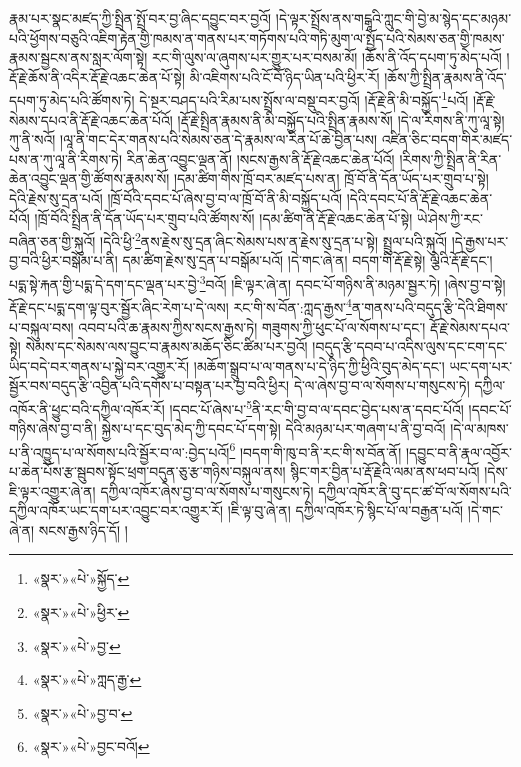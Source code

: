 རྣམ་པར་སྣང་མཛད་ཀྱི་སྤྲིན་སྤྲོ་བར་བྱ་ཞིང་དབྱུང་བར་བྱའོ། །དེ་ལྟར་སྤྲོས་ནས་གངྒཱའི་ཀླུང་གི་བྱེ་མ་སྙེད་དང་མཉམ་པའི་ཕྱོགས་བཅུའི་འཇིག་རྟེན་གྱི་ཁམས་ན་གནས་པར་གཏོགས་པའི་གཏི་མུག་ལ་སྤྱོད་པའི་སེམས་ཅན་གྱི་ཁམས་རྣམས་སྦྱངས་ནས་སླར་ལོག་སྟེ། རང་གི་ལུས་ལ་ཞུགས་པར་གྱུར་པར་བསམ་མོ། །ཆོས་ནི་འོད་དཔག་ཏུ་མེད་པའོ། །རྡོ་རྗེ་ཆོས་ནི་འདིར་རྡོ་རྗེ་འཆང་ཆེན་པོ་སྟེ། མི་འཇིགས་པའི་ངོ་བོ་ཉིད་ཡིན་པའི་ཕྱིར་རོ། །ཆོས་ཀྱི་སྤྲིན་རྣམས་ནི་འོད་དཔག་ཏུ་མེད་པའི་ཚོགས་ཏེ། དེ་སྔར་བཤད་པའི་རིམ་པས་སྤྲོས་ལ་བསྡུ་བར་བྱའོ། །རྡོ་རྗེ་ནི་མི་བསྐྱོད་\footnote{«སྣར་»«པེ་»སྐྱོད་}པའོ། །རྡོ་རྗེ་སེམས་དཔའ་ནི་རྡོ་རྗེ་འཆང་ཆེན་པོའོ། །རྡོ་རྗེ་སྤྲིན་རྣམས་ནི་མི་བསྐྱོད་པའི་སྤྲིན་རྣམས་སོ། །དེ་ལ་རིགས་ནི་ཀུ་ལཱ་སྟེ། ཀུ་ནི་སའོ། །ལཱ་ནི་གང་དེར་གནས་པའི་སེམས་ཅན་དེ་རྣམས་ལ་རིན་པོ་ཆེ་བྱིན་པས། འཛིན་ཅིང་བདག་གིར་མཛད་པས་ན་ཀུ་ལཱ་ནི་རིགས་ཏེ། རིན་ཆེན་འབྱུང་ལྡན་ནོ། །སངས་རྒྱས་ནི་རྡོ་རྗེ་འཆང་ཆེན་པོའོ། །རིགས་ཀྱི་སྤྲིན་ནི་རིན་ཆེན་འབྱུང་ལྡན་གྱི་ཚོགས་རྣམས་སོ། །དམ་ཚིག་གིས་ཁྲོ་བར་མཛད་པས་ན། ཁྲོ་བོ་ནི་དོན་ཡོད་པར་གྲུབ་པ་སྟེ། དེའི་རྗེས་སུ་དྲན་པའོ། །ཁྲོ་བོའི་དབང་པོ་ཞེས་བྱ་བ་ལ་ཁྲོ་བོ་ནི་མི་བསྐྱོད་པའོ། །དེའི་དབང་པོ་ནི་རྡོ་རྗེ་འཆང་ཆེན་པོའོ། །ཁྲོ་བོའི་སྤྲིན་ནི་དོན་ཡོད་པར་གྲུབ་པའི་ཚོགས་སོ། །དམ་ཚིག་ནི་རྡོ་རྗེ་འཆང་ཆེན་པོ་སྟེ། ཡེ་ཤེས་ཀྱི་རང་བཞིན་ཅན་གྱི་སྐུའོ། །དེའི་ཕྱི་\footnote{«སྣར་»«པེ་»ཕྱིར་}ནས་རྗེས་སུ་དྲན་ཞིང་སེམས་པས་ན་རྗེས་སུ་དྲན་པ་སྟེ། སྤྲུལ་པའི་སྐུའོ། །དེ་རྒྱས་པར་བྱ་བའི་ཕྱིར་བསྒོམ་པ་ནི། དམ་ཚིག་རྗེས་སུ་དྲན་པ་བསྒོམ་པའོ། །དེ་གང་ཞེ་ན། བདག་གི་རྡོ་རྗེ་སྟེ། ལྕེའི་རྡོ་རྗེ་དང་། པདྨ་སྟེ་རྐན་གྱི་པདྨ་དེ་དག་དང་ལྡན་པར་བྱེ་\footnote{«སྣར་»«པེ་»བྱ་}བའོ། །ཇི་ལྟར་ཞེ་ན། དབང་པོ་གཉིས་ནི་མཉམ་སྦྱར་ཏེ། །ཞེས་བྱ་བ་སྟེ། རྡོ་རྗེ་དང་པདྨ་དག་ལྟ་བུར་སྦྱོར་ཞིང་རེག་པ་དེ་ལས། རང་གི་ས་བོན་:ཀླད་རྒྱས་\footnote{«སྣར་»«པེ་»ཀླད་རྒྱ་}ན་གནས་པའི་བདུད་རྩི་དེའི་ཐིགས་པ་བསྐུལ་བས། འབབ་པའི་ཆ་རྣམས་ཀྱིས་སངས་རྒྱས་ཏེ། གཟུགས་ཀྱི་ཕུང་པོ་ལ་སོགས་པ་དང་། རྡོ་རྗེ་སེམས་དཔའ་སྟེ། སེམས་དང་སེམས་ལས་བྱུང་བ་རྣམས་མཆོད་ཅིང་ཚིམ་པར་བྱའོ། །བདུད་རྩི་དབབ་པ་འདིས་ལུས་དང་ངག་དང་ཡིད་བདེ་བར་གནས་པ་སྐྱེ་བར་འགྱུར་རོ། །མཆོག་སྒྲུབ་པ་ལ་གནས་པ་དེ་ཉིད་ཀྱི་ཕྱིའི་བུད་མེད་དང་། ཡང་དག་པར་སྦྱོར་བས་བདུད་རྩི་འབྱིན་པའི་དགོས་པ་བསྟན་པར་བྱ་བའི་ཕྱིར། དེ་ལ་ཞེས་བྱ་བ་ལ་སོགས་པ་གསུངས་ཏེ། དཀྱིལ་འཁོར་ནི་ཕྱུང་བའི་དཀྱིལ་འཁོར་རོ། །དབང་པོ་ཞེས་པ་\footnote{«སྣར་»«པེ་»བྱ་བ་}ནི་རང་གི་བྱ་བ་ལ་དབང་བྱེད་པས་ན་དབང་པོའོ། །དབང་པོ་གཉིས་ཞེས་བྱ་བ་ནི། སྐྱེས་པ་དང་བུད་མེད་ཀྱི་དབང་པོ་དག་སྟེ། དེའི་མཉམ་པར་གཞག་པ་ནི་བྱ་བའོ། །དེ་ལ་མཁས་པ་ནི་འཁྱུད་པ་ལ་སོགས་པའི་སྦྱོར་བ་ལ་:བྱེད་པའོ།\footnote{«སྣར་»«པེ་»བྱང་བའོ།} །བདག་གི་ཁུ་བ་ནི་རང་གི་ས་བོན་ནོ། །དབྱུང་བ་ནི་རྣལ་འབྱོར་པ་ཆེན་པོས་རྩ་སྦུབས་སྟོང་ཕྲག་བདུན་ཅུ་རྩ་གཉིས་བསྐུལ་ནས། སྙིང་གར་བྱིན་པ་རྡོ་རྗེའི་ལམ་ནས་ཕབ་པའོ། །དེས་ཇི་ལྟར་འགྱུར་ཞེ་ན། དཀྱིལ་འཁོར་ཞེས་བྱ་བ་ལ་སོགས་པ་གསུངས་ཏེ། དཀྱིལ་འཁོར་ནི་བུ་དང་ཚ་བོ་ལ་སོགས་པའི་དཀྱིལ་འཁོར་ཡང་དག་པར་འབྱུང་བར་འགྱུར་རོ། །ཇི་ལྟ་བུ་ཞེ་ན། དཀྱིལ་འཁོར་ཏེ་སྙིང་པོ་ལ་བརྒྱན་པའོ། །དེ་གང་ཞེ་ན། སངས་རྒྱས་ཉིད་དོ། །
